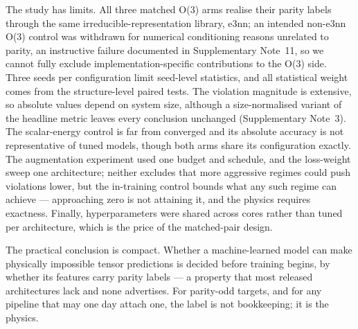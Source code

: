 The study has limits. All three matched O(3) arms realise their parity labels through the same irreducible-representation library, e3nn\cite{geiger2022e3nn}; an intended non-e3nn O(3) control was withdrawn for numerical conditioning reasons unrelated to parity, an instructive failure documented in Supplementary Note~11, so we cannot fully exclude implementation-specific contributions to the O(3) side. Three seeds per configuration limit seed-level statistics, and all statistical weight comes from the structure-level paired tests. The violation magnitude is extensive, so absolute values depend on system size, although a size-normalised variant of the headline metric leaves every conclusion unchanged (Supplementary Note~3). The scalar-energy control is far from converged and its absolute accuracy is not representative of tuned models, though both arms share its configuration exactly. The augmentation experiment used one budget and schedule, and the loss-weight sweep one architecture; neither excludes that more aggressive regimes could push violations lower, but the in-training control bounds what any such regime can achieve --- approaching zero is not attaining it, and the physics requires exactness. Finally, hyperparameters were shared across cores rather than tuned per architecture, which is the price of the matched-pair design.

The practical conclusion is compact. Whether a machine-learned model can make physically impossible tensor predictions is decided before training begins, by whether its features carry parity labels --- a property that most released architectures lack and none advertises. For parity-odd targets, and for any pipeline that may one day attach one, the label is not bookkeeping; it is the physics.
